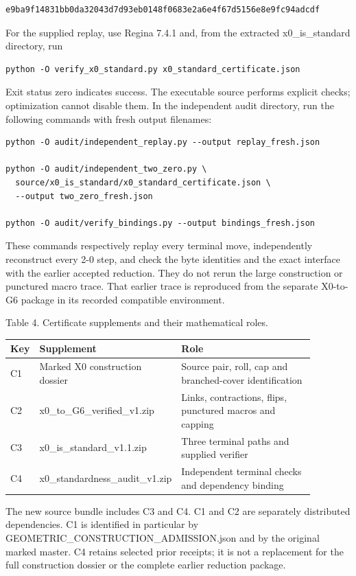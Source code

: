 \documentclass[11pt,letterpaper]{article}
\begin{document}
\begin{Verbatim}
e9ba9f14831bb0da32043d7d93eb0148f0683e2a6e4f67d5156e8e9fc94adcdf
\end{Verbatim}
For the supplied replay, use Regina 7.4.1 and, from the extracted x0\_is\_standard directory, run

\begin{Verbatim}
python -O verify_x0_standard.py x0_standard_certificate.json
\end{Verbatim}
Exit status zero indicates success. The executable source performs explicit checks; optimization cannot disable them. In the independent audit directory, run the following commands with fresh output filenames:

\begin{Verbatim}
python -O audit/independent_replay.py --output replay_fresh.json

python -O audit/independent_two_zero.py \
  source/x0_is_standard/x0_standard_certificate.json \
  --output two_zero_fresh.json

python -O audit/verify_bindings.py --output bindings_fresh.json
\end{Verbatim}
These commands respectively replay every terminal move, independently reconstruct every 2-0 step, and check the byte identities and the exact interface with the earlier accepted reduction. They do not rerun the large construction or punctured macro trace. That earlier trace is reproduced from the separate X0-to-G6 package in its recorded compatible environment.

\noindent\begin{minipage}{\linewidth}
\begin{center}\small
Table 4. Certificate supplements and their mathematical roles.\par\smallskip
\begin{tabular}{p{0.07\linewidth}p{0.36\linewidth}p{0.45\linewidth}}
\toprule
\textbf{Key} & \textbf{Supplement} & \textbf{Role} \\
\midrule
C1 & Marked X0 construction dossier & Source pair, roll, cap and branched-cover identification \\
C2 & x0\_to\_G6\_verified\_v1.zip & Links, contractions, flips, punctured macros and capping \\
C3 & x0\_is\_standard\_v1.1.zip & Three terminal paths and supplied verifier \\
C4 & x0\_standardness\_audit\_v1.zip & Independent terminal checks and dependency binding \\
\bottomrule
\end{tabular}
\end{center}
\end{minipage}\par\smallskip
The new source bundle includes C3 and C4. C1 and C2 are separately distributed dependencies. C1 is identified in particular by GEOMETRIC\_CONSTRUCTION\_ADMISSION.json and by the original marked master. C4 retains selected prior receipts; it is not a replacement for the full construction dossier or the complete earlier reduction package.
\end{document}
